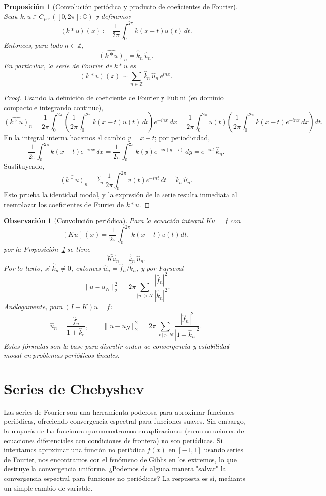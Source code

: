 \documentclass[a4paper,11pt]{report}
\newtheorem{proposition}[theorem]{Proposición}
\newtheorem{remark}[theorem]{Observación}
\begin{document}
\begin{proposition}[Convoluci\'on peri\'odica y producto de coeficientes de Fourier]\label{prop:convolucion_periodica_producto}
Sean $k,u\in C_{per}([0,2\pi];\mathbb{C})$ y definamos
\[
(k*u)(x):=\frac{1}{2\pi}\int_0^{2\pi}k(x-t)u(t)\,dt.
\]
Entonces, para todo $n\in\mathbb{Z}$,
\[
\widehat{(k*u)}_n=\hat k_n\,\hat u_n.
\]
En particular, la serie de Fourier de $k*u$ es
\[
(k*u)(x)\sim\sum_{n\in\mathbb{Z}}\hat k_n\,\hat u_n\,e^{inx}.
\]
\end{proposition}

\begin{proof}
Usando la definici\'on de coeficiente de Fourier y Fubini (en dominio compacto e integrando continuo),
\[
\widehat{(k*u)}_n
=\frac{1}{2\pi}\int_0^{2\pi}\!\left(\frac{1}{2\pi}\int_0^{2\pi}k(x-t)u(t)\,dt\right)e^{-inx}\,dx
=\frac{1}{2\pi}\int_0^{2\pi}u(t)\left(\frac{1}{2\pi}\int_0^{2\pi}k(x-t)e^{-inx}\,dx\right)dt.
\]
En la integral interna hacemos el cambio $y=x-t$; por periodicidad,
\[
\frac{1}{2\pi}\int_0^{2\pi}k(x-t)e^{-inx}\,dx
=\frac{1}{2\pi}\int_0^{2\pi}k(y)e^{-in(y+t)}\,dy
=e^{-int}\,\hat k_n.
\]
Sustituyendo,
\[
\widehat{(k*u)}_n
=\hat k_n\,\frac{1}{2\pi}\int_0^{2\pi}u(t)e^{-int}\,dt
=\hat k_n\,\hat u_n.
\]
Esto prueba la identidad modal, y la expresi\'on de la serie resulta inmediata al reemplazar los coeficientes de Fourier de $k*u$.
\end{proof}

\begin{remark}[Convolución periódica]
Para la ecuación integral $Ku=f$ con
\[
(Ku)(x)=\frac1{2\pi}\int_0^{2\pi}k(x-t)u(t)\,dt,
\]
por la Proposición~\ref{prop:convolucion_periodica_producto} se tiene
\[
\widehat{Ku}_n=\hat k_n\,\hat u_n.
\]
Por lo tanto, si $\hat k_n\neq 0$, entonces $\hat u_n=\hat f_n/\hat k_n$, y por Parseval
\[
\|u-u_N\|_2^2=2\pi\sum_{|n|>N}\frac{|\hat f_n|^2}{|\hat k_n|^2}.
\]
Análogamente, para $(I+K)u=f$:
\[
\hat u_n=\frac{\hat f_n}{1+\hat k_n},
\qquad
\|u-u_N\|_2^2=2\pi\sum_{|n|>N}\frac{|\hat f_n|^2}{|1+\hat k_n|^2}.
\]
Estas fórmulas son la base para discutir orden de convergencia y estabilidad modal en problemas periódicos lineales.
\end{remark}



\section{Series de Chebyshev}

Las series de Fourier son una herramienta poderosa para aproximar funciones periódicas, ofreciendo convergencia espectral para funciones suaves. Sin embargo, la mayoría de las funciones que encontramos en aplicaciones (como soluciones de ecuaciones diferenciales con condiciones de frontera) no son periódicas. Si intentamos aproximar una función no periódica $f(x)$ en $[-1,1]$ usando series de Fourier, nos encontramos con el fenómeno de Gibbs en los extremos, lo que destruye la convergencia uniforme. ¿Podemos de alguna manera "salvar" la convergencia espectral para funciones no periódicas? La respuesta es sí, mediante un simple cambio de variable.
\end{document}
